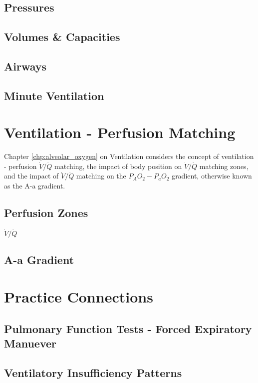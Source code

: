 \subsection{Pressures}

\subsection{Volumes \& Capacities}

\subsection{Airways}

\subsection{Minute Ventilation}

\section{Ventilation - Perfusion Matching}
Chapter \ref{chp:alveolar_oxygen} on Ventilation considers the concept of ventilation - perfusion $\dot{V}/\dot{Q}$ matching, the impact of body position on $\dot{V}/\dot{Q}$ matching zones, and the impact of $\dot{V}/\dot{Q}$ matching on the $P_AO_2-P_aO_2$ gradient, otherwise known as the A-a gradient.
\subsection{Perfusion Zones}
$\dot{V}/\dot{Q}$

\subsection{A-a Gradient}

\section{Practice Connections}

\subsection{Pulmonary Function Tests - Forced Expiratory Manuever}

\subsection{Ventilatory Insufficiency Patterns}

\printbibliography[heading=subbibintoc]